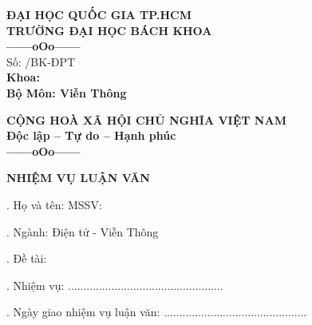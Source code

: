 
\thispagestyle{empty}

\begin{center}
\begin{minipage}[t]{0.48\textwidth}
\centering
\textbf{\small ĐẠI HỌC QUỐC GIA TP.HCM} \\
\textbf{\small TRƯỜNG ĐẠI HỌC BÁCH KHOA} \\
\vspace{0.2cm}
\textbf{\small ------oOo------} \\ %
\vspace{0.2cm}
Số: \underline{\hspace{3cm}} /BK-ĐPT \\[0.2cm]
\textbf{\small Khoa: \DEPARTMENT} \\
\textbf{\small Bộ Môn: Viễn Thông}
\end{minipage}
\hfill
\begin{minipage}[t]{0.48\textwidth}
\centering
\textbf{\small CỘNG HOÀ XÃ HỘI CHỦ NGHĨA VIỆT NAM} \\
\textbf{\small Độc lập -- Tự do -- Hạnh phúc} \\
\vspace{0.2cm}
\textbf{\small ------oOo------} %
\end{minipage}
\end{center}

\vspace{0.6cm}

\begin{center}
\textbf{\large NHIỆM VỤ LUẬN VĂN}
\end{center}

\vspace{0.5cm}

. Họ và tên: \TENTACGIA \hspace{2cm} MSSV: \MSSV

\vspace{0.2cm}
. Ngành: Điện tử - Viễn Thông

\vspace{0.2cm}
. Đề tài: \TENLUANVAN

\vspace{0.2cm}
. Nhiệm vụ: .................................................. 

\vspace{0.4cm}
. Ngày giao nhiệm vụ luận văn: .............................................. 


